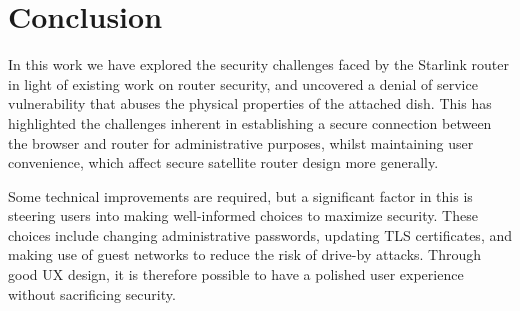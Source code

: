 \section{Conclusion}\label{sec:conclusion}

In this work we have explored the security challenges faced by the Starlink router in light of existing work on router security, and uncovered a denial of service vulnerability that abuses the physical properties of the attached dish.
This has highlighted the challenges inherent in establishing a secure connection between the browser and router for administrative purposes, whilst maintaining user convenience, which affect secure satellite router design more generally.

Some technical improvements are required, but a significant factor in this is steering users into making well-informed choices to maximize security.
These choices include changing administrative passwords, updating TLS certificates, and making use of guest networks to reduce the risk of drive-by attacks.
Through good UX design, it is therefore possible to have a polished user experience without sacrificing security.
